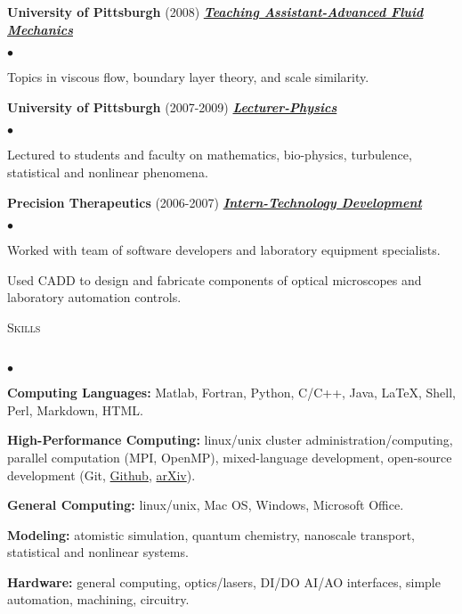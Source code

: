 \documentclass{article}
\newcommand{\lineunder}{\vspace*{-8pt} \\ \hspace*{-18pt} \hrulefill \\}
\newcommand{\header}[1]{{\hspace*{-15pt}\vspace*{6pt} \textsc{#1}} \vspace*{-6pt} \lineunder}
\newcommand{\employer}[3]{{ \textbf{#1} (#2) \underline{\textbf{\emph{#3}}}\\  }}
\newenvironment{achievements}{\begin{list}{$\bullet$}{\topsep 0pt \itemsep -2pt}}{\vspace*{4pt}\end{list}}
\begin{document}
\employer{University of Pittsburgh}{2008}{Teaching Assistant-Advanced Fluid Mechanics}
	\begin{achievements}
	\item Topics in viscous flow, boundary layer theory, and scale similarity. 
	\end{achievements}

\employer{University of Pittsburgh}{2007-2009}{Lecturer-Physics}
	\begin{achievements}
	\item Lectured to students and faculty on mathematics, bio-physics, turbulence, statistical and nonlinear phenomena. 
	\end{achievements}

\employer{Precision Therapeutics}{2006-2007}{Intern-Technology Development}
	\begin{achievements}
	\item Worked with team of software developers and laboratory equipment specialists.
	\item Used CADD to design and fabricate components of optical microscopes and laboratory automation controls. 
	\end{achievements}

\header{Skills}
\begin{achievements}

\item \textbf{Computing Languages:} Matlab, Fortran, Python, C/C++, Java, \LaTeX, Shell, Perl, Markdown, HTML.

\item \textbf{High-Performance Computing:} linux/unix cluster administration/computing, parallel computation (MPI, OpenMP), mixed-language development, open-source development (Git, \href{http://github.com/jasonlarkin}{Github}, \href{http://arxiv.org/find/physics/1/au:+Larkin_J/0/1/0/all/0/1}{arXiv}).

\item \textbf{General Computing:} linux/unix, Mac OS, Windows, Microsoft Office.

\item \textbf{Modeling:} atomistic simulation, quantum chemistry, nanoscale transport, statistical and nonlinear systems.

\item \textbf{Hardware:} general computing, optics/lasers, DI/DO AI/AO interfaces, simple automation, machining, circuitry. 
\end{achievements}
\end{document}
